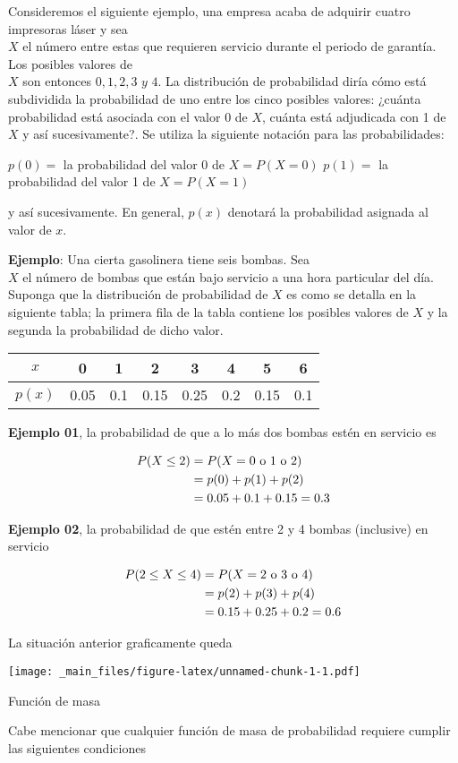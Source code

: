 \documentclass[
]{book}
\begin{document}
Consideremos el siguiente ejemplo, una empresa acaba de adquirir cuatro impresoras láser y sea\\
\(X\) el número entre estas que requieren servicio durante el periodo de garantía. Los posibles valores de\\
\(X\) son entonces \(0, 1, 2, 3 \,\, y\,\, 4\). La distribución de probabilidad diría cómo está subdividida la probabilidad de uno entre los cinco posibles valores: ¿cuánta probabilidad está asociada con el valor 0 de \(X\), cuánta está adjudicada con 1 de \(X\) y así sucesivamente?. Se utiliza la siguiente notación para las probabilidades:

\(p(0) =\) la probabilidad del valor 0 de \(X = P(X=0)\)
\(p(1) =\) la probabilidad del valor 1 de \(X = P(X=1)\)

y así sucesivamente. En general, \(p(x)\) denotará la probabilidad asignada al valor de \(x\).

\textbf{Ejemplo}: Una cierta gasolinera tiene seis bombas. Sea\\
\(X\) el número de bombas que están bajo servicio a una hora particular del día. Suponga que la distribución de probabilidad de \(X\) es como se detalla en la siguiente tabla; la primera fila de la tabla contiene los posibles valores de \(X\) y la segunda la probabilidad de dicho valor.

\begin{longtable}[]{@{}cccccccc@{}}
\toprule\noalign{}
\(x\) & 0 & 1 & 2 & 3 & 4 & 5 & 6 \\
\midrule\noalign{}
\endhead
\bottomrule\noalign{}
\endlastfoot
\(p(x)\) & 0.05 & 0.1 & 0.15 & 0.25 & 0.2 & 0.15 & 0.1 \\
\end{longtable}

\textbf{Ejemplo 01}, la probabilidad de que a lo más dos bombas estén en servicio es

\begin{equation}
  \notag
  \begin{split}
    P(X\leq 2) &= P(X = 0 \text{ o } 1 \text{ o } 2) \\
    & = p(0) + p(1) + p(2) \\
    & = 0.05 + 0.1 + 0.15 = 0.3
  \end{split}
\end{equation}

\textbf{Ejemplo 02}, la probabilidad de que estén entre 2 y 4 bombas (inclusive) en servicio

\begin{equation}
  \notag
  \begin{split}
    P(2\leq X\leq 4) &= P(X = 2 \text{ o } 3 \text{ o } 4)\\
    & = p(2) + p(3) + p(4) \\
    & = 0.15 + 0.25 + 0.2 = 0.6
  \end{split}
\end{equation}

La situación anterior graficamente queda

\texttt{[image: \_main\_files/figure-latex/unnamed-chunk-1-1.pdf]}

Función de masa

Cabe mencionar que cualquier función de masa de probabilidad requiere cumplir las siguientes condiciones

  
\end{document}
